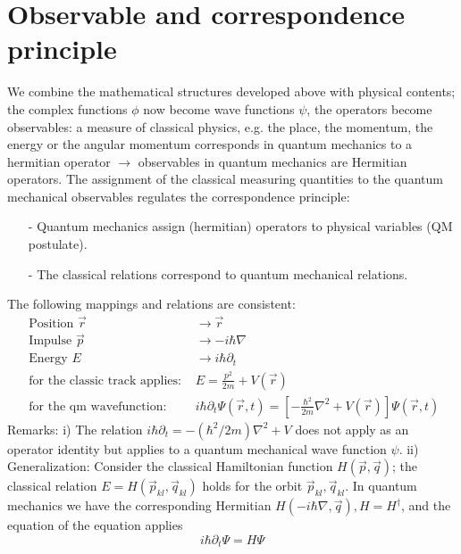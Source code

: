 \section{Observable and correspondence principle}
We combine the mathematical structures developed above with physical contents; the complex functions $\phi$ now become wave functions $\psi$, the operators become observables: a measure of classical physics, e.g. the place, the momentum, the energy or the angular momentum corresponds in quantum mechanics to a hermitian operator $\to$ observables in quantum mechanics are Hermitian operators. The assignment of the classical measuring quantities to the quantum mechanical observables regulates the correspondence principle:
\begin{itemize}
    \item[-] Quantum mechanics assign (hermitian) operators to physical variables (QM postulate).
    \item[-] The classical relations correspond to quantum mechanical relations.
\end{itemize}



The following mappings and relations are consistent:
$$
\begin{array}{cl}{\text { Position } \vec{r}} & {\longrightarrow \vec{r}} \\ {\text { Impulse } \vec{p}} & {\longrightarrow-i \hbar \nabla} \\ {\text { Energy } E} & {\longrightarrow i \hbar \partial_{t}} \\ {\text { for the classic track applies: }} & {E=\frac{p^{2}}{2 m}+V(\vec{r})} \\ {\text { for the qm wavefunction: }} & {i \hbar \partial_{t} \Psi(\vec{r}, t)=\left[-\frac{\hbar^{2}}{2 m} \nabla^{2}+V(\vec{r})\right] \Psi(\vec{r}, t)}\end{array}
$$
Remarks: i) The relation $i\hbar\partial_t=-(\hbar^2/2m)\nabla^2+V$ does not apply as an operator identity but applies to a quantum mechanical wave function $\psi$. ii) Generalization: Consider the classical Hamiltonian function $H(\vec{p},\vec{q})$; the classical relation $E=H(\vec{p}_{kl},\vec{q}_{kl})$ holds for the orbit $\vec{p}_{kl},\vec{q}_{kl}$.
In quantum mechanics we have the corresponding Hermitian $H(-i\hbar\nabla,\vec{q}),H=H^{\dagger}$, and the equation of the equation applies
\begin{equation}
    i\hbar \partial_t\Psi=H\Psi
\end{equation}
